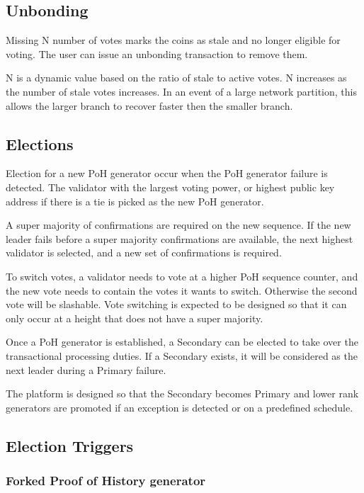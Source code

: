 \documentclass[12pt]{article}
\begin{document}
\subsection{Unbonding}

Missing N number of votes marks the coins as stale and no longer eligible for voting. The user can issue an unbonding transaction to remove them.

N is a dynamic value based on the ratio of stale to active votes. N increases as the number of stale votes increases. In an event of a large network partition, this allows the larger branch to recover faster then the smaller branch.

\subsection{Elections}\label{subsec:elections}
Election for a new PoH generator occur when the PoH generator failure is detected. The validator with the largest voting power, or highest public key address if there is a tie is picked as the new PoH generator.

A super majority of confirmations are required on the new sequence. If the new leader fails before a super majority confirmations are available, the next highest validator is selected, and a new set of confirmations is required.

To switch votes, a validator needs to vote at a higher PoH sequence counter, and the new vote needs to contain the votes it wants to switch. Otherwise the second vote will be slashable. Vote switching is expected to be designed so that it can only occur at a height that does not have a super majority.

Once a PoH generator is established, a Secondary can be elected to take over the transactional processing duties. If a Secondary exists, it will be considered as the next leader during a Primary failure.

The platform is designed so that the Secondary becomes Primary and lower rank generators are promoted if an exception is detected or on a predefined schedule.
\subsection{Election Triggers}
\subsubsection{Forked Proof of History generator}
\end{document}
